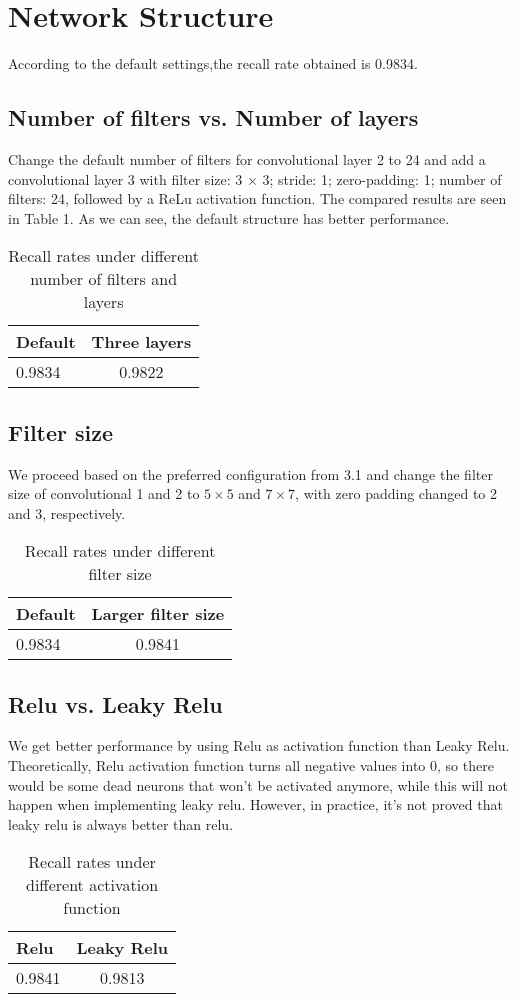 \documentclass[a4paper]{article}
\begin{document}
\section{Network Structure}
According to the default settings,the recall rate obtained is 0.9834.


\subsection{Number of filters vs. Number of layers}
Change the default number of filters for convolutional layer 2 to 24 and add a convolutional
layer 3 with filter size:  3
×
3; stride:  1; zero-padding:  1; number of filters:  24, followed by a
ReLu activation function. The compared results are seen in Table 1. As we can see, the default structure has better performance.
\begin{table}[!htbp]
\centering
\begin{tabular}{l|c}
Default & Three layers \\\hline
0.9834 & 0.9822 \\

\end{tabular}
\caption{\label{tab:widgets}Recall rates under different number of filters and layers}
\end{table}


\subsection{Filter size}
We proceed based on the preferred configuration from 3.1 and change the filter size of convolutional 1 and 2 to $5\times 5$ and $7\times 7$, with zero padding changed to 2 and 3, respectively. 
\begin{table}[!htbp]
\centering
\begin{tabular}{l|c}
Default & Larger filter size \\\hline
0.9834 & 0.9841 \\

\end{tabular}
\caption{\label{tab:widgets}Recall rates under different filter size}
\end{table}
\subsection{Relu vs. Leaky Relu}
We get better performance by using Relu as activation function than Leaky Relu. Theoretically, Relu activation function turns all negative values into 0, so there would be some dead neurons that won't be activated anymore, while this will not happen when implementing leaky relu. However, in practice, it's not proved that leaky relu is always better than relu.
\begin{table}[!htbp]
\centering
\begin{tabular}{l|c}
Relu & Leaky Relu \\\hline
0.9841 & 0.9813 \\

\end{tabular}
\caption{\label{tab:widgets}Recall rates under different activation function}
\end{table}
\end{document}
